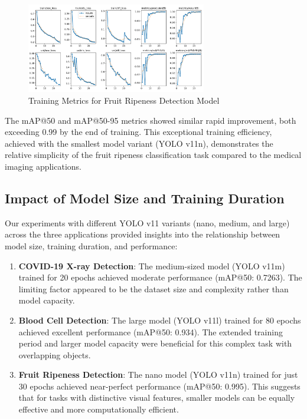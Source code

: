 \begin{figure}[ht]
\centering
\includegraphics[width=0.7\textwidth]{datas/agriculture/results.png}
\caption{Training Metrics for Fruit Ripeness Detection Model}
\label{fig:fruit_training}
\end{figure}

\begin{multicols}{2}
The mAP@50 and mAP@50-95 metrics showed similar rapid improvement, both exceeding 0.99 by the end of training. This exceptional training efficiency, achieved with the smallest model variant (YOLO v11n), demonstrates the relative simplicity of the fruit ripeness classification task compared to the medical imaging applications.

\subsection{Impact of Model Size and Training Duration}

Our experiments with different YOLO v11 variants (nano, medium, and large) across the three applications provided insights into the relationship between model size, training duration, and performance:

\begin{enumerate}
    \item \textbf{COVID-19 X-ray Detection}: The medium-sized model (YOLO v11m) trained for 20 epochs achieved moderate performance (mAP@50: 0.7263). The limiting factor appeared to be the dataset size and complexity rather than model capacity.
    
    \item \textbf{Blood Cell Detection}: The large model (YOLO v11l) trained for 80 epochs achieved excellent performance (mAP@50: 0.934). The extended training period and larger model capacity were beneficial for this complex task with overlapping objects.
    
    \item \textbf{Fruit Ripeness Detection}: The nano model (YOLO v11n) trained for just 30 epochs achieved near-perfect performance (mAP@50: 0.995). This suggests that for tasks with distinctive visual features, smaller models can be equally effective and more computationally efficient.
\end{enumerate}


\end{multicols}
